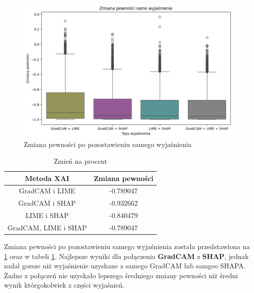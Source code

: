 \begin{figure}[h]
	\centering\includegraphics[width=.9\textwidth]{img/combine_confidence_exp_and}
	\caption{Zmiana pewności po pozostawieniu samego wyjaśnienia}  \label{rys:combineandconfidencean}
\end{figure}
\begin{table}[h]
	\centering
	\begin{tabular}{|c|c|}
		\hline
		\textbf{Metoda XAI}  & Zmiana pewności \\
		\hline
		GradCAM i LIME       & -0.789047       \\
		\hline
		GradCAM i SHAP       & -0.932662       \\
		\hline
		LIME i SHAP          & -0.840479       \\
		\hline
		GradCAM, LIME i SHAP & -0.789047       \\
		\hline
	\end{tabular}
	\caption{Zmień na procent}
	\label{tab:combineandconfidenceand}
\end{table}
Zmiana pewności po pozostawieniu samego wyjaśnienia została przedstawiona na \ref{rys:combineandconfidencean} oraz w tabeli \ref{tab:combineandconfidenceand}.
Najlepsze wyniki dla połączenia \textbf{GradCAM} z \textbf{SHAP}, jednak zadal gorsze niż wyjaśnienie uzyskane z samego GradCAM lub samgeo SHAPA.
Żadne z połączeń nie uzyskało lepszego średniego zmiany pewności niż średni wynik którgokolwiek z części wyjaśnień.

\vspace{1cm}

